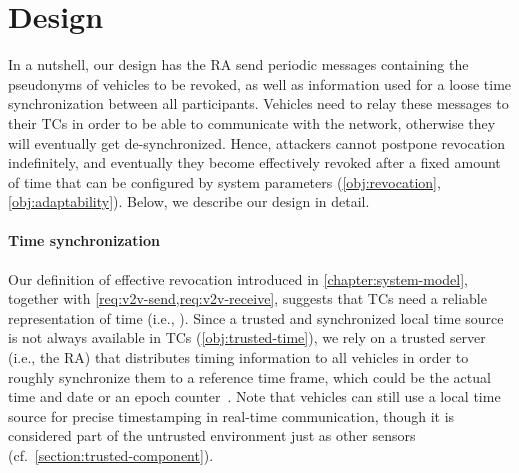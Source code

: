 \section{Design}
\label{chapter:design}

In a nutshell, our design has the \ac{RA} send periodic messages containing the
pseudonyms of vehicles to be revoked, as well as information used for a loose
time synchronization between all participants. Vehicles need to relay these
messages to their \acp{TC} in order to be able to communicate with the network,
otherwise they will eventually get de-synchronized. Hence, attackers cannot
postpone revocation indefinitely, and eventually they become effectively revoked
after a fixed amount of time that can be configured by system parameters
(\ref{obj:revocation}, \ref{obj:adaptability}). Below, we describe our design in
detail.

\paragraph{Time synchronization}
%
Our definition of effective revocation introduced in
\cref{chapter:system-model}, together with \cref{req:v2v-send,req:v2v-receive},
suggests that \acp{TC} need a reliable representation of time (i.e.,
\funcnow{}). Since a trusted and synchronized local time source is not always
available in \acp{TC} (\ref{obj:trusted-time}), we rely on a trusted server
(i.e., the \ac{RA}) that distributes timing information to all vehicles in order
to roughly synchronize them to a reference time frame, which could be the actual
time and date or an epoch counter~\cite{ietfepochs}. Note that vehicles can
still use a local time source for precise timestamping in real-time
communication, though it is considered part of the untrusted environment just as
other sensors (cf.~\cref{section:trusted-component}).

